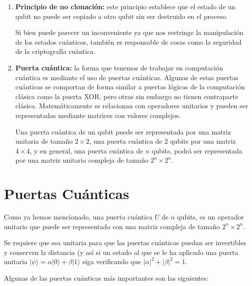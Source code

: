 \begin{enumerate}
    \item \textbf{Principio de no clonación:} este principio establece que el estado de un qubit no puede ser copiado a otro qubit sin ser destruido en el proceso.
    
    Si bien puede parecer un inconveniente ya que nos restringe la manipulación de los estados cuánticos, también es responsable de cosas como la seguridad de la criptografía cuántica.

    \item \textbf{Puerta cuántica:} la forma que tenemos de trabajar en computación cuántica es mediante el uso de puertas cuánticas.
    Algunas de estas puertas cuánticas se comportan de forma similar a puertas lógicas de la computación clásica como la puerta XOR, pero otras sin embargo no tienen contraparte clásica.
    Matemáticamente se relacionan con operadores unitarios y pueden ser representadas mediante matrices con valores complejos.
    
    Una puerta cuántica de un qubit puede ser representada por una matriz unitaria de tamaño $2\times2$, una puerta cuántica de $2$ qubits por una matriz $4\times4$, y en general, una puerta cuántica de $n$ qubits, podrá ser representada por una matriz unitaria compleja de tamaño $2^n \times 2^n$.
\end{enumerate}


\section{Puertas Cuánticas}
Como ya hemos mencionado, una puerta cuántica $U$ de $n$ qubits, es un operador unitario que puede ser representado con una matriz compleja de tamaño $2^n \times 2^n$.

Se requiere que sea unitaria para que las puertas cuánticas puedan ser invertibles y conserven la distancia (y así si un estado al que se le ha aplicado una puerta unitaria $|\psi\rangle = \alpha|0\rangle + \beta|1\rangle$ siga verificando que $|\alpha|^2 + |\beta|^2 = 1$.

Algunas de las puertas cuánticas más importantes son las siguientes:

